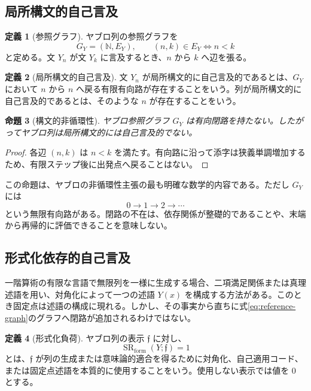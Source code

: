 \documentclass[a4paper,11pt]{ltjsarticle}
\theoremstyle{definition}
\newtheorem{definition}{定義}[section]
\theoremstyle{plain}
\newtheorem{proposition}[definition]{命題}
\newcommand{\SR}{\operatorname{SR}}
\newcommand{\N}{\mathbb N}
\begin{document}
\subsection{局所構文的自己言及}

\begin{definition}[参照グラフ]
ヤブロ列の参照グラフを
\begin{equation}
 G_Y=(\N,E_Y),
 \qquad
 (n,k)\in E_Y
 \Longleftrightarrow n<k
 \label{eq:reference-graph}
\end{equation}
と定める。文 $Y_n$ が文 $Y_k$ に言及するとき、$n$ から $k$ へ辺を張る。
\end{definition}

\begin{definition}[局所構文的自己言及]
文 $Y_n$ が局所構文的に自己言及的であるとは、$G_Y$ において $n$ から $n$ へ戻る有限有向路が存在することをいう。列が局所構文的に自己言及的であるとは、そのような $n$ が存在することをいう。
\end{definition}

\begin{proposition}[構文的非循環性]
ヤブロ参照グラフ $G_Y$ は有向閉路を持たない。したがってヤブロ列は局所構文的には自己言及的でない。
\end{proposition}

\begin{proof}
各辺 $(n,k)$ は $n<k$ を満たす。有向路に沿って添字は狭義単調増加するため、有限ステップ後に出発点へ戻ることはない。
\end{proof}

この命題は、ヤブロの非循環性主張の最も明確な数学的内容である。ただし $G_Y$ には
\begin{equation}
 0\longrightarrow1\longrightarrow2\longrightarrow\cdots
\end{equation}
という無限有向路がある。閉路の不在は、依存関係が整礎的であることや、末端から再帰的に評価できることを意味しない。

\subsection{形式化依存的自己言及}

一階算術の有限な言語で無限列を一様に生成する場合、二項満足関係または真理述語を用い、対角化によって一つの述語 $Y(x)$ を構成する方法がある。このとき固定点は述語の構成に現れる\cite{Ketland2005Yablo}。しかし、その事実から直ちに式\eqref{eq:reference-graph}のグラフへ閉路が追加されるわけではない。

\begin{definition}[形式化負荷]
ヤブロ列の表示 $\mathfrak f$ に対し、
\begin{equation}
 \SR_{\mathrm{form}}(Y;\mathfrak f)=1
\end{equation}
とは、$\mathfrak f$ が列の生成または意味論的適合を得るために対角化、自己適用コード、または固定点述語を本質的に使用することをいう。使用しない表示では値を $0$ とする。
\end{definition}
\end{document}
